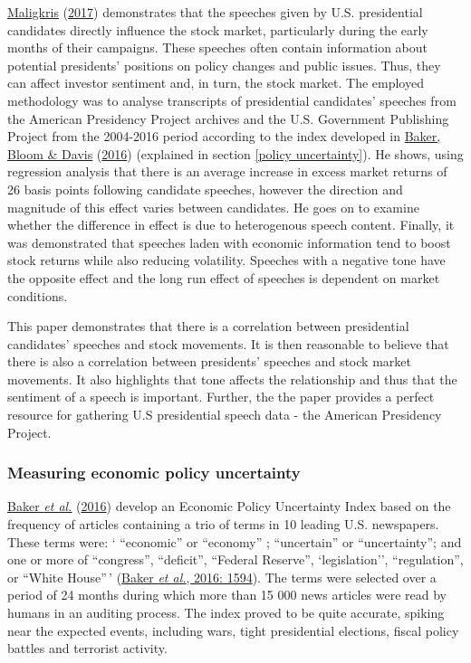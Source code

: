 \documentclass[11pt,preprint, authoryear]{elsarticle}
\numberwithin{equation}{section}
\numberwithin{figure}{section}
\numberwithin{table}{section}
\begin{document}
\protect\hyperlink{ref-maligkris2017political}{Maligkris}
(\protect\hyperlink{ref-maligkris2017political}{2017}) demonstrates that
the speeches given by U.S. presidential candidates directly influence
the stock market, particularly during the early months of their
campaigns. These speeches often contain information about potential
presidents' positions on policy changes and public issues. Thus, they
can affect investor sentiment and, in turn, the stock market. The
employed methodology was to analyse transcripts of presidential
candidates' speeches from the American Presidency Project archives and
the U.S. Government Publishing Project from the 2004-2016 period
according to the index developed in
\protect\hyperlink{ref-baker2016measuring}{Baker, Bloom \& Davis}
(\protect\hyperlink{ref-baker2016measuring}{2016}) (explained in section
\ref{policy uncertainty}). He shows, using regression analysis that
there is an average increase in excess market returns of 26 basis points
following candidate speeches, however the direction and magnitude of
this effect varies between candidates. He goes on to examine whether the
difference in effect is due to heterogenous speech content. Finally, it
was demonstrated that speeches laden with economic information tend to
boost stock returns while also reducing volatility. Speeches with a
negative tone have the opposite effect and the long run effect of
speeches is dependent on market conditions.

This paper demonstrates that there is a correlation between presidential
candidates' speeches and stock movements. It is then reasonable to
believe that there is also a correlation between presidents' speeches
and stock market movements. It also highlights that tone affects the
relationship and thus that the sentiment of a speech is important.
Further, the the paper provides a perfect resource for gathering U.S
presidential speech data - the American Presidency Project.

\hypertarget{measuring-economic-policy-uncertainty}{%
\subsubsection{\texorpdfstring{Measuring economic policy uncertainty
\label{policy uncertainty}}{Measuring economic policy uncertainty }}\label{measuring-economic-policy-uncertainty}}

\protect\hyperlink{ref-baker2016measuring}{Baker \emph{et al.}}
(\protect\hyperlink{ref-baker2016measuring}{2016}) develop an Economic
Policy Uncertainty Index based on the frequency of articles containing a
trio of terms in 10 leading U.S. newspapers. These terms were: `
``economic'' or ``economy'' ; ``uncertain'' or ``uncertainty''; and one
or more of ``congress'', ``deficit'', ``Federal Reserve'',
`legislation'', ``regulation'', or ``White House''\,'
(\protect\hyperlink{ref-baker2016measuring}{Baker \emph{et al.}, 2016:
1594}). The terms were selected over a period of 24 months during which
more than 15 000 news articles were read by humans in an auditing
process. The index proved to be quite accurate, spiking near the
expected events, including wars, tight presidential elections, fiscal
policy battles and terrorist activity.
\end{document}
